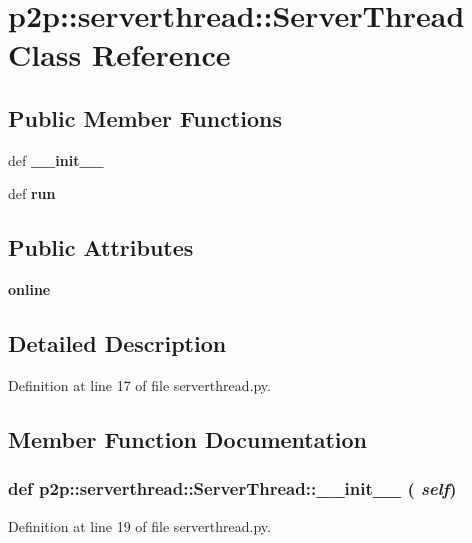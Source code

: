 \section{p2p::serverthread::ServerThread Class Reference}
\label{classp2p_1_1serverthread_1_1ServerThread}
\subsection*{Public Member Functions}
\begin{CompactItemize}
\item 
def {\bf \_\-\_\-init\_\-\_\-}
\item 
def {\bf run}
\end{CompactItemize}
\subsection*{Public Attributes}
\begin{CompactItemize}
\item 
{\bf online}
\end{CompactItemize}


\subsection{Detailed Description}


Definition at line 17 of file serverthread.py.

\subsection{Member Function Documentation}
\subsubsection{\setlength{\rightskip}{0pt plus 5cm}def p2p::serverthread::ServerThread::\_\-\_\-init\_\-\_\- ( {\em self})}\label{classp2p_1_1serverthread_1_1ServerThread_4a6a3d038c614a2e042247c1d1b86a7e}




Definition at line 19 of file serverthread.py.
